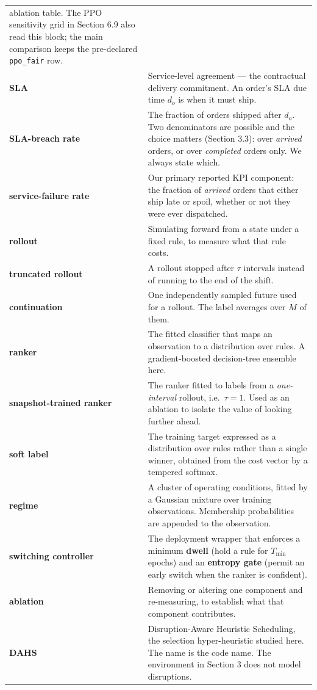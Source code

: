\documentclass[review,3p,times]{elsarticle}
\theoremstyle{definition}
\begin{document}
{\begin{longtable}[]{@{}
  >{\raggedright\arraybackslash}p{}
  >{\raggedright\arraybackslash}p{}@{}}
ablation table. The PPO sensitivity grid in Section 6.9 also read this
block; the main comparison keeps the pre-declared \texttt{ppo\_fair}
row. \\
\textbf{SLA} & Service-level agreement --- the contractual delivery
commitment. An order's SLA due time \(d_o\) is when it must ship. \\
\textbf{SLA-breach rate} & The fraction of orders shipped after \(d_o\).
Two denominators are possible and the choice matters (Section 3.3): over
\emph{arrived} orders, or over \emph{completed} orders only. We always
state which. \\
\textbf{service-failure rate} & Our primary reported KPI component: the
fraction of \emph{arrived} orders that either ship late or spoil,
whether or not they were ever dispatched. \\
\textbf{rollout} & Simulating forward from a state under a fixed rule,
to measure what that rule costs. \\
\textbf{truncated rollout} & A rollout stopped after \(\tau\) intervals
instead of running to the end of the shift. \\
\textbf{continuation} & One independently sampled future used for a
rollout. The label averages over \(M\) of them. \\
\textbf{ranker} & The fitted classifier that maps an observation to a
distribution over rules. A gradient-boosted decision-tree ensemble
here. \\
\textbf{snapshot-trained ranker} & The ranker fitted to labels from a
\emph{one-interval} rollout, i.e.~\(\tau = 1\). Used as an ablation to
isolate the value of looking further ahead. \\
\textbf{soft label} & The training target expressed as a distribution
over rules rather than a single winner, obtained from the cost vector by
a tempered softmax. \\
\textbf{regime} & A cluster of operating conditions, fitted by a
Gaussian mixture over training observations. Membership probabilities
are appended to the observation. \\
\textbf{switching controller} & The deployment wrapper that enforces a
minimum \textbf{dwell} (hold a rule for \(T_{\min}\) epochs) and an
\textbf{entropy gate} (permit an early switch when the ranker is
confident). \\
\textbf{ablation} & Removing or altering one component and re-measuring,
to establish what that component contributes. \\
\textbf{DAHS} & Disruption-Aware Heuristic Scheduling, the selection
hyper-heuristic studied here. The name is the code name. The environment
in Section 3 does not model disruptions. \\
\end{longtable}
}
\end{document}
